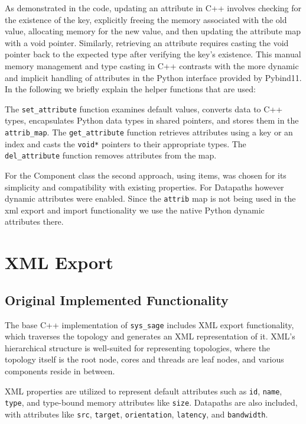 As demonstrated in the code, updating an attribute in C++ involves checking for the existence of the key, explicitly freeing the memory associated with the old value, allocating memory for the new value, and then updating the attribute map with a void pointer. Similarly, retrieving an attribute requires casting the void pointer back to the expected type after verifying the key's existence. This manual memory management and type casting in C++ contrasts with the more dynamic and implicit handling of attributes in the Python interface provided by Pybind11.
In the following we briefly explain the helper functions that are used:

The \verb|set_attribute| function examines default values, converts data to C++ types, encapsulates Python data types in shared pointers, and stores them in the \verb|attrib_map|. The \verb|get_attribute| function retrieves attributes using a key or an index and casts the \verb|void*| pointers to their appropriate types. The \verb|del_attribute| function removes attributes from the map.

For the Component class the second approach, using items, was chosen for its simplicity and compatibility with existing properties. For Datapaths however dynamic attributes were enabled. Since the \verb|attrib| map is not being used in the xml export and import functionality we use the native Python dynamic attributes there.

\section{XML Export}

\subsection{Original Implemented Functionality}

The base C++ implementation of \verb|sys_sage| includes XML export functionality, which traverses the topology and generates an XML representation of it. XML's hierarchical structure is well-suited for representing topologies, where the topology itself is the root node, cores and threads are leaf nodes, and various components reside in between.

XML properties are utilized to represent default attributes such as \verb|id|, \verb|name|, \verb|type|, and type-bound memory attributes like \verb|size|. Datapaths are also included, with attributes like \verb|src|, \verb|target|, \verb|orientation|, \verb|latency|, and \verb|bandwidth|.


